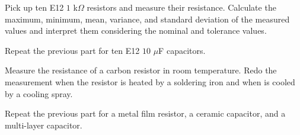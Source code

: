 \documentclass[11pt]{article}
\begin{document}

\begin{question}


    \begin{subquestion}{Pick up ten E12 $1$ k$\Omega$ resistors and measure their resistance. Calculate the maximum, minimum, mean, variance, and standard deviation of the measured values and interpret them considering the nominal and tolerance values. }
    \end{subquestion}

    \begin{subquestion}{Repeat the previous part for ten E12 $10$ $\mu$F capacitors. }
    \end{subquestion}

\end{question}


\begin{question}


    \begin{subquestion}{Measure the resistance of a carbon resistor in room temperature. Redo the measurement when the resistor is heated by a soldering iron and when is cooled by a cooling spray. }
    \end{subquestion}

    \begin{subquestion}{Repeat the previous part for a metal film resistor, a ceramic capacitor, and a multi-layer capacitor. }
    \end{subquestion}

\end{question}
\end{document}
